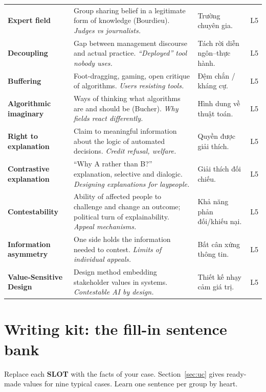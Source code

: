 \documentclass[11pt,a4paper]{article}
\newcommand{\slot}[1]{{\setlength{\fboxsep}{1.2pt}\colorbox{slotbg}{\sffamily\scriptsize\bfseries\color{RoyalBlue}#1}}}
\begin{document}
{\begin{longtable}{>{\RaggedRight\arraybackslash\bfseries}p{3.3cm}>{\RaggedRight\arraybackslash}p{5.1cm}>{\RaggedRight\arraybackslash}p{5.1cm}>{\centering\arraybackslash}p{0.8cm}}
Expert field & Group sharing belief in a legitimate form of knowledge (Bourdieu). \newline\textit{\color{teal}Judges vs journalists.} & \textcolor{tipc}{Trường chuyên gia.} & L5\\[3pt]
Decoupling & Gap between management discourse and actual practice. \newline\textit{\color{teal}“Deployed” tool nobody uses.} & \textcolor{tipc}{Tách rời diễn ngôn–thực hành.} & L5\\[3pt]
Buffering & Foot-dragging, gaming, open critique of algorithms. \newline\textit{\color{teal}Users resisting tools.} & \textcolor{tipc}{Đệm chắn / kháng cự.} & L5\\[3pt]
Algorithmic imaginary & Ways of thinking what algorithms are and should be (Bucher). \newline\textit{\color{teal}Why fields react differently.} & \textcolor{tipc}{Hình dung về thuật toán.} & L5\\[3pt]
Right to explanation & Claim to meaningful information about the logic of automated decisions. \newline\textit{\color{teal}Credit refusal, welfare.} & \textcolor{tipc}{Quyền được giải thích.} & L5\\[3pt]
Contrastive explanation & “Why A rather than B?” explanation, selective and dialogic. \newline\textit{\color{teal}Designing explanations for laypeople.} & \textcolor{tipc}{Giải thích đối chiếu.} & L5\\[3pt]
Contestability & Ability of affected people to challenge and change an outcome; political turn of explainability. \newline\textit{\color{teal}Appeal mechanisms.} & \textcolor{tipc}{Khả năng phản đối/khiếu nại.} & L5\\[3pt]
Information asymmetry & One side holds the information needed to contest. \newline\textit{\color{teal}Limits of individual appeals.} & \textcolor{tipc}{Bất cân xứng thông tin.} & L5\\[3pt]
Value-Sensitive Design & Design method embedding stakeholder values in systems. \newline\textit{\color{teal}Contestable AI by design.} & \textcolor{tipc}{Thiết kế nhạy cảm giá trị.} & L5\\[3pt]
\end{longtable}}
\section{Writing kit: the fill-in sentence bank}
Replace each \slot{SLOT} with the facts of your case. Section~\ref{sec:uc} gives ready-made values for nine typical cases. Learn one sentence per group by heart.
\end{document}
